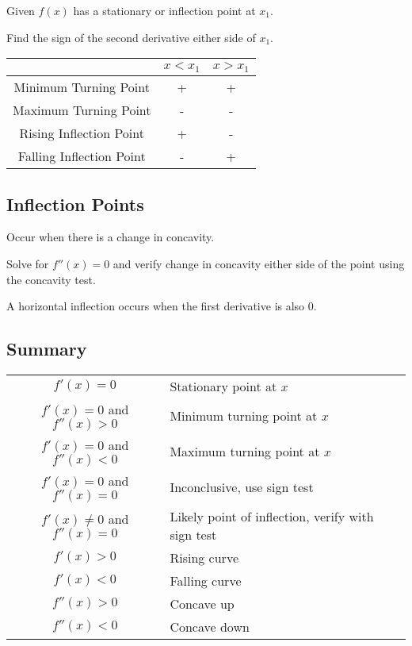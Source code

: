 \documentclass[a4paper,11pt]{article}
\begin{document}
Given $f(x)$ has a stationary or inflection point at $x_1$.

Find the sign of the second derivative either side of $x_1$.

\begin{center}
\begin{tabular}{c|c|c}
& $x < x_1$ & $x > x_1$ \\
\hline
Minimum Turning Point    & + & + \\
Maximum Turning Point    & - & - \\
Rising Inflection Point  & + & - \\
Falling Inflection Point & - & + \\
\end{tabular}
\end{center}


\subsection{Inflection Points}

Occur when there is a change in concavity.

Solve for $f''(x) = 0$ and verify change in concavity either side of the point
using the concavity test.

A horizontal inflection occurs when the first derivative is also 0.


\subsection{Summary}

\begin{center}
\begin{tabular}{cl}
$f'(x) = 0$ & Stationary point at $x$ \\
$f'(x) = 0$ and $f''(x) > 0$ & Minimum turning point at $x$ \\
$f'(x) = 0$ and $f''(x) < 0$ & Maximum turning point at $x$ \\
$f'(x) = 0$ and $f''(x) = 0$ & Inconclusive, use sign test \\
$f'(x) \neq 0$ and $f''(x) = 0$ & Likely point of inflection, verify with sign test \\
$f'(x) > 0$ & Rising curve \\
$f'(x) < 0$ & Falling curve \\
$f''(x) > 0$ & Concave up \\
$f''(x) < 0$ & Concave down \\
\end{tabular}
\end{center}
\end{document}
